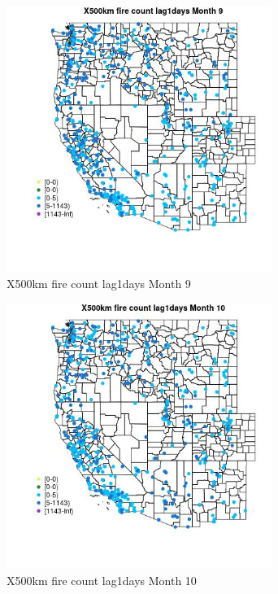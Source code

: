 \begin{figure} 
\centering  
\includegraphics[width=0.77\textwidth]{Code_Outputs/Report_ML_input_PM25_Step4_part_e_de_duplicated_aves_compiled_2019-05-14wNAs_MapObsMo9X500km_fire_count_lag1days.jpg} 
\caption{\label{fig:Report_ML_input_PM25_Step4_part_e_de_duplicated_aves_compiled_2019-05-14wNAsMapObsMo9X500km_fire_count_lag1days}X500km fire count lag1days Month 9} 
\end{figure} 
 

\begin{figure} 
\centering  
\includegraphics[width=0.77\textwidth]{Code_Outputs/Report_ML_input_PM25_Step4_part_e_de_duplicated_aves_compiled_2019-05-14wNAs_MapObsMo10X500km_fire_count_lag1days.jpg} 
\caption{\label{fig:Report_ML_input_PM25_Step4_part_e_de_duplicated_aves_compiled_2019-05-14wNAsMapObsMo10X500km_fire_count_lag1days}X500km fire count lag1days Month 10} 
\end{figure} 
 

